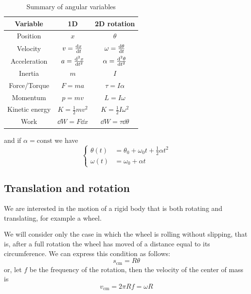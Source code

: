 \documentclass[12pt]{extarticle}
\begin{document}
\begin{table}[H]
    \centering
    \begin{tabular}{|c|c|c|}
        \hline
        \textbf{Variable} & \textbf{1D}             & \textbf{2D rotation}         \\
        \hline
        Position          & $x$                     & $\theta$                     \\
        Velocity          & $v = \dv{x}{t}$         & $\omega = \dv{\theta}{t}$    \\
        Acceleration      & $a = \dv[2]{x}{t}$      & $\alpha = \dv[2]{\theta}{t}$ \\
        Inertia           & $m$                     & $I$                          \\
        Force/Torque      & $F = ma$                & $\tau = I \alpha$            \\
        Momentum          & $p = mv$                & $L = I \omega$               \\
        Kinetic energy    & $K = \frac{1}{2} m v^2$ & $K = \frac{1}{2} I \omega^2$ \\
        Work              & $\dd{W} = F \dd{x}$     & $\dd{W} = \tau \dd{\theta}$  \\
        \hline
    \end{tabular}
    \caption{Summary of angular variables}
    \label{tab:angular-variables}
\end{table}

and if $\alpha = \text{const}$ we have
\begin{equation}
    \begin{cases}
        \theta(t) & = \theta_0 + \omega_0 t + \frac{1}{2}\alpha t^2 \\
        \omega(t) & = \omega_0 + \alpha t
    \end{cases}
\end{equation}

\subsection{Translation and rotation}

We are interested in the motion of a rigid body that is both rotating and translating, for example a wheel.

We will consider only the case in which the wheel is rolling without slipping, that is, after a full rotation the wheel has moved of a distance equal to its circumference.
We can express this condition as follows:
\begin{equation}
    s_{\text{cm}} = R \theta
\end{equation}
or, let $f$ be the frequency of the rotation, then the velocity of the center of mass is
\begin{equation}
    v_{\text{cm}} = 2 \pi R f = \omega R
\end{equation}
\end{document}
